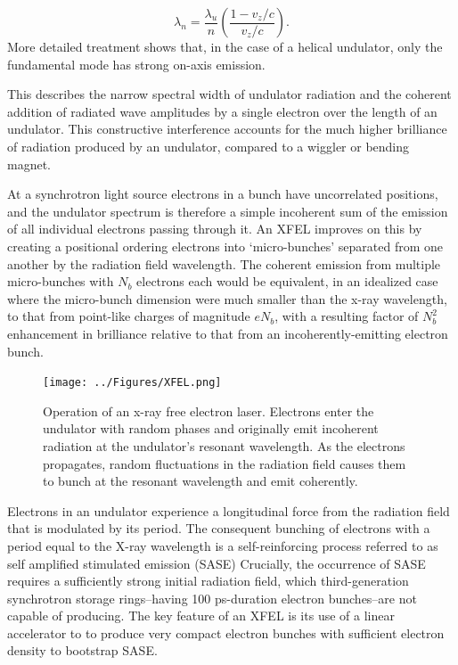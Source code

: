 \documentclass [11pt, proquest, article] {uwthesis}[2016/11/22]
\begin{document}
\begin{equation}
\lambda_n = \frac{\lambda_u}{n}(\frac{1 - v_z/c}{v_z/c}).
\end{equation}
More detailed treatment shows that, in the case of a helical undulator, only the fundamental mode has strong on-axis emission. \cite{PhysRevLett.100.174801}

This describes the narrow spectral width of undulator radiation and the coherent addition of radiated wave amplitudes by a single electron over the length of an undulator. This constructive interference accounts for the much higher brilliance of radiation produced by an undulator, compared to a wiggler or bending magnet. 

At a synchrotron light source electrons in a bunch have uncorrelated positions, and the undulator spectrum is therefore a simple incoherent sum of the emission of all individual electrons passing through it. An XFEL improves on this by creating a positional ordering electrons into `micro-bunches' separated from one another by the radiation field wavelength. The coherent emission from multiple micro-bunches with $N_b$ electrons each would be equivalent, in an idealized case where the micro-bunch dimension were much smaller than the x-ray wavelength, to that from point-like charges of magnitude $e N_b$, with a resulting factor of $N_b^2$ enhancement in brilliance relative to that from an incoherently-emitting electron bunch.%


\begin{figure}[h] 
\caption{Operation of an x-ray free electron laser.\cite{mcneil2010x} Electrons enter the undulator with random phases and originally emit incoherent radiation at the undulator's resonant wavelength. As the electrons propagates, random fluctuations in the radiation field causes them to bunch at the resonant wavelength and emit coherently.}
\label{fig:xfel}
\centering
\texttt{[image: ../Figures/XFEL.png]}
\end{figure}

Electrons in an undulator experience a longitudinal force from the radiation field that is modulated by its period. 
The consequent bunching of electrons with a period equal to the X-ray wavelength is a self-reinforcing process referred to as self amplified stimulated emission (SASE)%
Crucially, the occurrence of SASE requires a sufficiently strong initial radiation field, \cite{milton2001exponential} which third-generation synchrotron storage rings--having 100 ps-duration electron bunches--are not capable of producing. The key feature of an XFEL is its use of a linear accelerator to to produce very compact electron bunches with sufficient electron density to bootstrap SASE.
\end{document}
